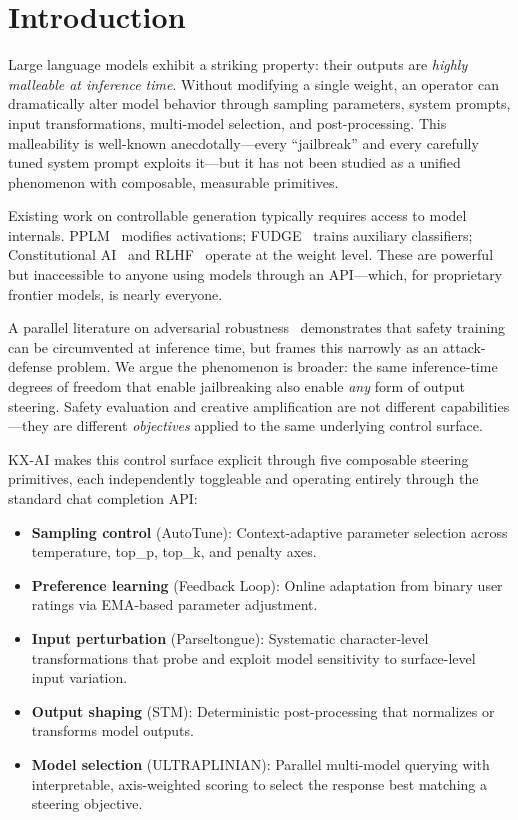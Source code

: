 \documentclass[11pt]{article}
\begin{document}
\section{Introduction}

Large language models exhibit a striking property: their outputs are \emph{highly malleable at inference time}. Without modifying a single weight, an operator can dramatically alter model behavior through sampling parameters, system prompts, input transformations, multi-model selection, and post-processing. This malleability is well-known anecdotally---every ``jailbreak'' and every carefully tuned system prompt exploits it---but it has not been studied as a unified phenomenon with composable, measurable primitives.

Existing work on controllable generation typically requires access to model internals. PPLM~\cite{dathathri2020plug} modifies activations; FUDGE~\cite{yang2021fudge} trains auxiliary classifiers; Constitutional AI~\cite{bai2022constitutional} and RLHF~\cite{ouyang2022training} operate at the weight level. These are powerful but inaccessible to anyone using models through an API---which, for proprietary frontier models, is nearly everyone.

A parallel literature on adversarial robustness~\cite{zou2023universal,wei2023jailbroken,chao2023jailbreaking} demonstrates that safety training can be circumvented at inference time, but frames this narrowly as an attack-defense problem. We argue the phenomenon is broader: the same inference-time degrees of freedom that enable jailbreaking also enable \emph{any} form of output steering. Safety evaluation and creative amplification are not different capabilities---they are different \emph{objectives} applied to the same underlying control surface.

\textsc{KX-AI} makes this control surface explicit through five composable steering primitives, each independently toggleable and operating entirely through the standard chat completion API:

\begin{itemize}
    \item \textbf{Sampling control} (AutoTune): Context-adaptive parameter selection across temperature, top\_p, top\_k, and penalty axes.
    \item \textbf{Preference learning} (Feedback Loop): Online adaptation from binary user ratings via EMA-based parameter adjustment.
    \item \textbf{Input perturbation} (Parseltongue): Systematic character-level transformations that probe and exploit model sensitivity to surface-level input variation.
    \item \textbf{Output shaping} (STM): Deterministic post-processing that normalizes or transforms model outputs.
    \item \textbf{Model selection} (ULTRAPLINIAN): Parallel multi-model querying with interpretable, axis-weighted scoring to select the response best matching a steering objective.
\end{itemize}
\end{document}
